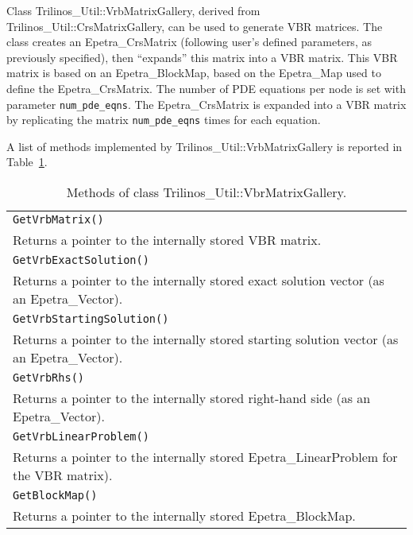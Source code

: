 \medskip

Class Trilinos\_Util::VrbMatrixGallery, derived from
Trilinos\_Util::CrsMatrixGallery, can be used to generate VBR matrices.
The class creates an Epetra\_CrsMatrix (following user's defined
parameters, as previously specified), then ``expands'' this matrix into
a VBR matrix. This VBR  matrix is based on an Epetra\_BlockMap, based on
the Epetra\_Map used to define the Epetra\_CrsMatrix. The number of PDE
equations per node is set with parameter \verb!num_pde_eqns!. The
Epetra\_CrsMatrix is expanded into a VBR matrix by replicating the
matrix \verb!num_pde_eqns! times for each equation.

A list of methods implemented by Trilinos\_Util::VrbMatrixGallery is
reported in Table~\ref{tab:triutils:vbr}.

\begin{table}[htbp]
  \centering
  \begin{tabular}{| p{14cm} |}
    \hline
    {\tt GetVrbMatrix()}\\
    {Returns a pointer to the internally
  stored VBR matrix.} \\
\tt GetVrbExactSolution() \\
{Returns a pointer to the internally
  stored exact solution vector (as an Epetra\_Vector).} \\
{\tt GetVrbStartingSolution()} \\
 {Returns a pointer to the
  internally stored starting solution vector (as an Epetra\_Vector).} \\
{\tt GetVrbRhs()}  \\
 {Returns a pointer to the internally
  stored right-hand side (as an Epetra\_Vector).} \\
{\tt GetVrbLinearProblem()} \\
 {Returns a pointer to the internally
  stored  Epetra\_LinearProblem for the VBR matrix).} \\
{\tt GetBlockMap()}\\
 {Returns a pointer to the internally
  stored Epetra\_BlockMap.} \\
    \hline
  \end{tabular}
  \caption{Methods of class Trilinos\_Util::VbrMatrixGallery.}
  \label{tab:triutils:vbr}
\end{table}

\medskip

